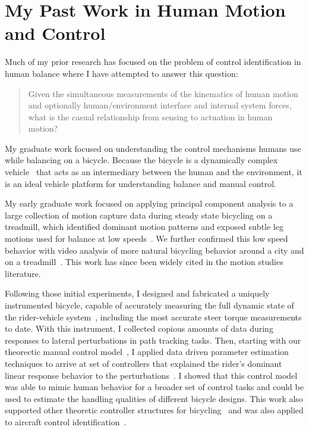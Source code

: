 \documentclass{article}
\begin{document}
\section*{My Past Work in Human Motion and Control}
%
Much of my prior research has focused on the problem of control identification
in human balance where I have attempted to answer this question:

\begin{quote}
  Given the simultaneous measurements of the kinematics of human motion and
  optionally human/environment interface and internal system forces, what is
  the casual relationship from sensing to actuation in human motion?
\end{quote}

My graduate work focused on understanding the control mechanisms humans use
while balancing on a bicycle. Because the bicycle is a dynamically complex
vehicle~\cite{Astrom2005,Meijaard2007,Moore2007,Moore2008} that acts as an
intermediary between the human and the environment, it is an ideal vehicle
platform for understanding balance and manual control.

My early graduate work focused on applying principal component analysis to a
large collection of motion capture data during steady state bicycling on a
treadmill, which identified dominant motion patterns and exposed subtle leg
motions used for balance at low speeds~\cite{Moore2009a,Moore2011c}. We further
confirmed this low speed behavior with video analysis of more natural bicycling
behavior around a city and on a treadmill~\cite{Kooijman2009}. This work has
since been widely cited in the motion studies literature.

Following those initial experiments, I designed and fabricated a uniquely
instrumented bicycle, capable of accurately measuring the full dynamic state of
the rider-vehicle system~\cite{Moore2012,Moore2013}, including the most
accurate steer torque measurements to date. With this instrument, I collected
copious amounts of data during responses to lateral perturbations in path
tracking tasks. Then, starting with our theorectic manual control
model~\cite{Hess2012}, I applied data driven parameter estimation techniques to
arrive at set of controllers that explained the rider's dominant linear
response behavior to the perturbations~\cite{Moore2012}. I showed that this
control model was able to mimic human behavior for a broader set of control
tasks and could be used to estimate the handling qualities of different bicycle
designs. This work also supported other theoretic controller structures for
bicycling~\cite{Schwab2012a,Schwab2012,Schwab2013} and was also applied to
aircraft control identification~\cite{Hess2013}.
\end{document}
